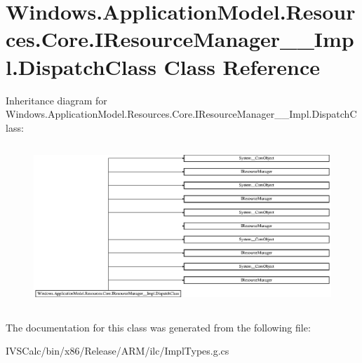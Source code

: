 \hypertarget{class_windows_1_1_application_model_1_1_resources_1_1_core_1_1_i_resource_manager_____impl_1_1_dispatch_class}{}\section{Windows.\+Application\+Model.\+Resources.\+Core.\+I\+Resource\+Manager\+\_\+\+\_\+\+Impl.\+Dispatch\+Class Class Reference}
\label{class_windows_1_1_application_model_1_1_resources_1_1_core_1_1_i_resource_manager_____impl_1_1_dispatch_class}
Inheritance diagram for Windows.\+Application\+Model.\+Resources.\+Core.\+I\+Resource\+Manager\+\_\+\+\_\+\+Impl.\+Dispatch\+Class\+:\begin{figure}[H]
\begin{center}
\leavevmode
\includegraphics[height=6.160000cm]{class_windows_1_1_application_model_1_1_resources_1_1_core_1_1_i_resource_manager_____impl_1_1_dispatch_class}
\end{center}
\end{figure}


The documentation for this class was generated from the following file\+:\begin{DoxyCompactItemize}
\item 
I\+V\+S\+Calc/bin/x86/\+Release/\+A\+R\+M/ilc/Impl\+Types.\+g.\+cs\end{DoxyCompactItemize}
